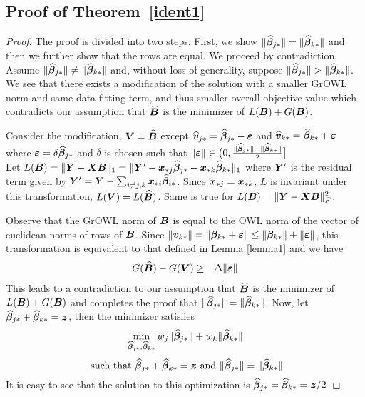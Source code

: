 \subsection*{Proof of Theorem~\ref{ident1}}
\begin{proof}
The proof is divided into two steps. First, we show
$\|\widehat {\boldsymbol{\beta}}_{j {\ast}}\| = \|\widehat {\boldsymbol{\beta}}_{k {\ast}}\|$ and then we further show that the
rows are equal. We proceed by contradiction. Assume
$\|\widehat {\boldsymbol{\beta}}_{j {\ast}}\| \neq\|\widehat {\boldsymbol{\beta}}_{k {\ast}}\|$ and, without loss of
generality, suppose $\|\widehat {\boldsymbol{\beta}}_{j {\ast}}\| > \|\widehat {\boldsymbol{\beta}}_{k {\ast}}\|$. We see that
there exists a modification of the solution with a smaller GrOWL norm and same
data-fitting term, and thus smaller overall objective value which contradicts our
assumption that $\widehat {\boldsymbol{B}}$ is the minimizer of $L(\boldsymbol{B}) + G(\boldsymbol{B})$.

Consider the modification, $\boldsymbol{V} = \widehat {\boldsymbol{B}}$ except
$\widehat {\boldsymbol{v}}_{j {\ast}} = \widehat {\boldsymbol{\beta}}_{j {\ast}} - \boldsymbol{\varepsilon}$ and 
$\widehat {\boldsymbol{v}}_{k {\ast}} = \widehat {\boldsymbol{\beta}}_{k {\ast}} + \boldsymbol{\varepsilon}$  where
$\boldsymbol{\varepsilon} = \delta \widehat {\boldsymbol{\beta}}_{j {\ast}}$ and $\delta$ is chosen such that
$ \| \boldsymbol{\varepsilon} \| \in \big (0, \frac{\|\widehat {\boldsymbol{\beta}}_{j {\ast}}\| - \| \widehat {\boldsymbol{\beta}}_{k {\ast}} \|}{2} \big ]$\\

Let
$L(\boldsymbol{B}) = \|\boldsymbol{Y} - \boldsymbol{X} \boldsymbol{B} \|_1 = \|\boldsymbol{Y}' - \boldsymbol{x}_{{\ast} j} \widehat {\boldsymbol{\beta}}_{j {\ast}} - \boldsymbol{x}_{{\ast} k} \widehat{\boldsymbol{\beta}}_{k {\ast}}\|_1$
where $\boldsymbol{Y}'$ is the residual term given by
$\boldsymbol{Y}' = \boldsymbol{Y} - \sum_{i \neq j, k} \boldsymbol{x}_{{\ast} i} \widehat {\boldsymbol{\beta}}_{i {\ast}}$. Since
$\boldsymbol{x}_{{\ast} j} = \boldsymbol{x}_{{\ast} k}$, $L$ is invariant under this transformation, \ie
$L(\boldsymbol{V}) = L(\widehat {\boldsymbol{B}}) $. Same is true for $L(\boldsymbol{B}) = \|\boldsymbol{Y} - \boldsymbol{X} \boldsymbol{B} \|_F^2$.

Observe that the GrOWL norm of $\boldsymbol{B}$ is equal to the OWL norm of the vector of euclidean
norms of rows of $\boldsymbol{B}$. Since $\| \boldsymbol{v}_{k {\ast}} \| = \| \boldsymbol{\beta}_{k {\ast}} + \boldsymbol{\varepsilon} \| \leq \|
\boldsymbol{\beta}_{k {\ast}} \| + \| \boldsymbol{\varepsilon} \|$, this transformation is equivalent to that defined in Lemma
\ref{lemma1} and we have
\begin{eqnarray*}
 G(\widehat{\boldsymbol{B}}) - G(\boldsymbol{V}) & \geq & \Delta \|\boldsymbol{\varepsilon}\| 
\end{eqnarray*}
This leads to a contradiction to our assumption that $\widehat {\boldsymbol{B}}$ is the minimizer of
$L(\boldsymbol{B}) + G(\boldsymbol{B})$ and completes the proof that $\|\widehat {\boldsymbol{\beta}}_{j {\ast}}\| = \|\widehat
{\boldsymbol{\beta}}_{k {\ast}}\|$.
Now, let $\widehat {\boldsymbol{\beta}}_{j {\ast}} + \widehat {\boldsymbol{\beta}}_{k {\ast}} = \boldsymbol{z}$, then the minimizer
satisfies
$$\min_{\widehat {\boldsymbol{\beta}}_{j {\ast}}, \widehat {\boldsymbol{\beta}}_{k {\ast}}} w_j\|\widehat {\boldsymbol{\beta}}_{j {\ast}}\| + w_k \|\widehat {\boldsymbol{\beta}}_{k {\ast}}\| $$
$$\textnormal{ such that } \widehat {\boldsymbol{\beta}}_{j {\ast}} + \widehat {\boldsymbol{\beta}}_{k {\ast}} = \boldsymbol{z} \textnormal{ and } \|\widehat {\boldsymbol{\beta}}_{j {\ast}}\| = \|\widehat {\boldsymbol{\beta}}_{k {\ast}}\| $$
It is easy to see that the solution to this optimization is
$\widehat {\boldsymbol{\beta}}_{j {\ast}} = \widehat {\boldsymbol{\beta}}_{k {\ast}} = \boldsymbol{z}/2$
\end{proof}

